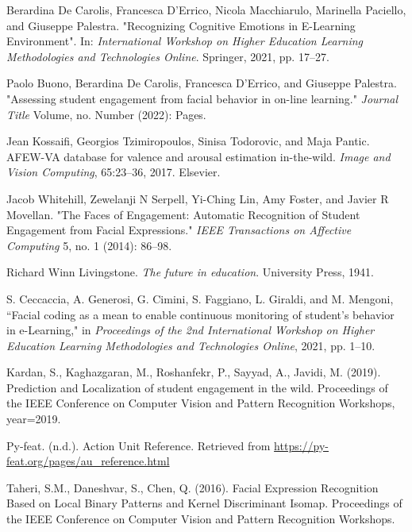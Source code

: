 \begin{thebibliography}{9}

    Berardina De Carolis, Francesca D’Errico, Nicola Macchiarulo, Marinella Paciello, and Giuseppe Palestra. 
    "Recognizing Cognitive Emotions in E-Learning Environment". In: 
    \textit{International Workshop on Higher Education Learning Methodologies and Technologies Online}. Springer, 2021, pp. 17--27.
    
    Paolo Buono, Berardina De Carolis, Francesca D'Errico, and Giuseppe Palestra.
    "Assessing student engagement from facial behavior in on-line learning."
    \textit{Journal Title} Volume, no. Number (2022): Pages.
    
    Jean Kossaifi, Georgios Tzimiropoulos, Sinisa Todorovic, and Maja Pantic.
    AFEW-VA database for valence and arousal estimation in-the-wild.
    \textit{Image and Vision Computing}, 65:23--36, 2017. Elsevier.
    
    Jacob Whitehill, Zewelanji N Serpell, Yi-Ching Lin, Amy Foster, and Javier R Movellan. 
    "The Faces of Engagement: Automatic Recognition of Student Engagement from Facial Expressions." 
    \textit{IEEE Transactions on Affective Computing} 5, no. 1 (2014): 86--98.
    
    Richard Winn Livingstone.
    \textit{The future in education}. University Press, 1941.
    
    S. Ceccaccia, A. Generosi, G. Cimini, S. Faggiano, L. Giraldi, and M. Mengoni, 
    ``Facial coding as a mean to enable continuous monitoring of student's behavior in e-Learning," in 
    \textit{Proceedings of the 2nd International Workshop on Higher Education Learning Methodologies and Technologies Online}, 2021, pp. 1--10.
    
    Kardan, S., Kaghazgaran, M., Roshanfekr, P., Sayyad, A., Javidi, M. (2019). 
    Prediction and Localization of student engagement in the wild. Proceedings of the IEEE Conference on Computer Vision and Pattern Recognition Workshops,
    year={2019}.
    
    Py-feat. (n.d.). Action Unit Reference. Retrieved from \url{https://py-feat.org/pages/au_reference.html}
    
    Taheri, S.M., Daneshvar, S., Chen, Q. (2016). 
    Facial Expression Recognition Based on Local Binary Patterns and Kernel Discriminant Isomap. 
    Proceedings of the IEEE Conference on Computer Vision and Pattern Recognition Workshops.
    

\end{thebibliography}
